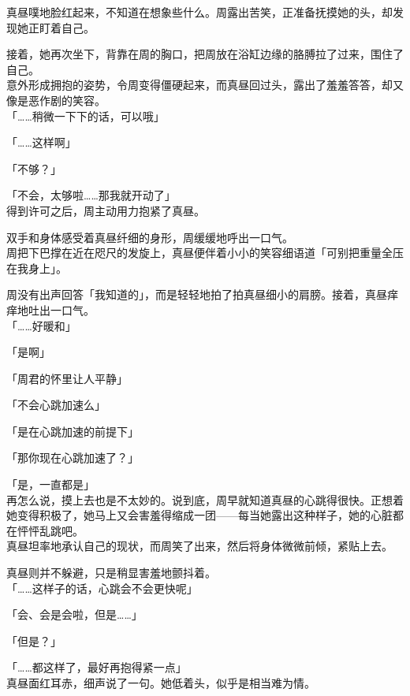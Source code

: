 真昼噗地脸红起来，不知道在想象些什么。周露出苦笑，正准备抚摸她的头，却发现她正盯着自己。

接着，她再次坐下，背靠在周的胸口，把周放在浴缸边缘的胳膊拉了过来，围住了自己。\\

意外形成拥抱的姿势，令周变得僵硬起来，而真昼回过头，露出了羞羞答答，却又像是恶作剧的笑容。\\

「……稍微一下下的话，可以哦」

「……这样啊」

「不够？」

「不会，太够啦……那我就开动了」\\

得到许可之后，周主动用力抱紧了真昼。

双手和身体感受着真昼纤细的身形，周缓缓地呼出一口气。\\

周把下巴撑在近在咫尺的发旋上，真昼便伴着小小的笑容细语道「可别把重量全压在我身上」。

周没有出声回答「我知道的」，而是轻轻地拍了拍真昼细小的肩膀。接着，真昼痒痒地吐出一口气。\\

「……好暖和」

「是啊」

「周君的怀里让人平静」

「不会心跳加速么」

「是在心跳加速的前提下」

「那你现在心跳加速了？」

「是，一直都是」\\

再怎么说，摸上去也是不太妙的。说到底，周早就知道真昼的心跳得很快。正想着她变得积极了，她马上又会害羞得缩成一团——每当她露出这种样子，她的心脏都在怦怦乱跳吧。\\

真昼坦率地承认自己的现状，而周笑了出来，然后将身体微微前倾，紧贴上去。

真昼则并不躲避，只是稍显害羞地颤抖着。\\

「……这样子的话，心跳会不会更快呢」

「会、会是会啦，但是……」

「但是？」

「……都这样了，最好再抱得紧一点」\\

真昼面红耳赤，细声说了一句。她低着头，似乎是相当难为情。

